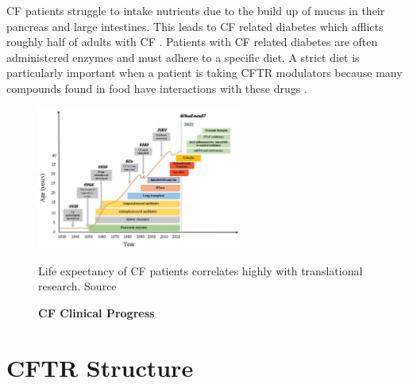 CF patients struggle to intake nutrients due to the build up of mucus in their pancreas and large intestines. This leads to CF related diabetes which afflicts roughly half of adults with CF \cite{Kayani2018}. Patients with CF related diabetes are often administered enzymes and must adhere to a specific diet. A strict diet is particularly important when a patient is taking CFTR modulators because many compounds found in food have interactions with these drugs \cite{}.

\begin{figure}
	\label{CF_life_expectancy}
	\begin{center}
	\includegraphics[width=0.6\textwidth]{figures/CF_life_expectancy.png}
	\end{center}
	\captionsetup{singlelinecheck = false, justification=raggedright}
	\caption[CF Clinical Progress] {\textbf{CF Clinical Progress}}{Life expectancy of CF patients correlates highly with translational research. Source \cite{garcia2022}} 
\end{figure}

\section{CFTR Structure}

